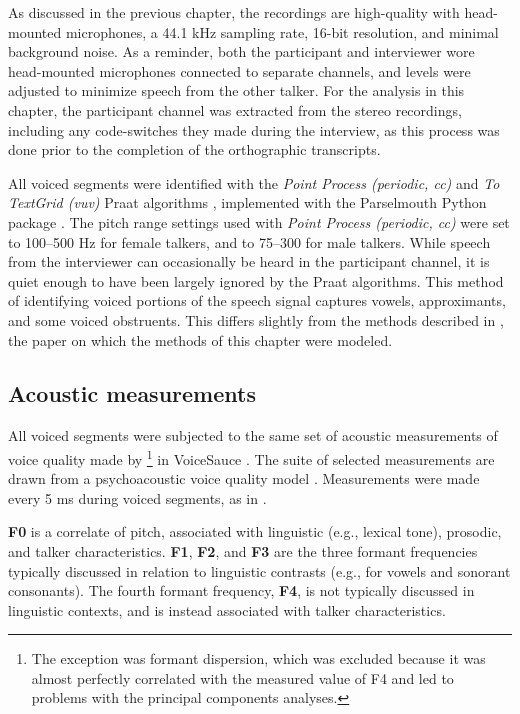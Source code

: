As discussed in the previous chapter, the recordings are high-quality with head-mounted microphones, a 44.1 kHz sampling rate, 16-bit resolution, and minimal background noise. As a reminder, both the participant and interviewer wore head-mounted microphones connected to separate channels, and levels were adjusted to minimize speech from the other talker. For the analysis in this chapter, the participant channel was extracted from the stereo recordings, including any code-switches they made during the interview, as this process was done prior to the completion of the orthographic transcripts. 

All voiced segments were identified with the \textit{Point Process (periodic, cc)} and \textit{To TextGrid (vuv)} Praat algorithms \citep{boersma_2021_praat}, implemented with the Parselmouth Python package \citep{jadoul_2018_parselmouth}. The pitch range settings used with \textit{Point Process (periodic, cc)} were set to 100--500 Hz for female talkers, and to 75--300 for male talkers. While speech from the interviewer can occasionally be heard in the participant channel, it is quiet enough to have been largely ignored by the Praat algorithms. This method of identifying voiced portions of the speech signal captures vowels, approximants, and some voiced obstruents. This differs slightly from the methods described in \citet{lee_2019_acoustic-paper}, the paper on which the methods of this chapter were modeled. 

\subsection{Acoustic measurements}\label{ch3:sec:acoustic}
All voiced segments were subjected to the same set of acoustic measurements of voice quality made by \citet{lee_2019_acoustic-paper}\footnote{The exception was formant dispersion, which was excluded because it was almost perfectly correlated with the measured value of F4 and led to problems with the principal components analyses.} in VoiceSauce \citep{shue_2011_voicesauce}. The suite of selected measurements are drawn from a psychoacoustic voice quality model \citep{kreiman_2014_theory}. Measurements were made every 5 ms during voiced segments, as in \citet{lee_2019_acoustic-paper}.

\textbf{F0} is a correlate of pitch, associated with linguistic (e.g., lexical tone), prosodic, and talker characteristics. \textbf{F1}, \textbf{F2}, and \textbf{F3} are the three formant frequencies typically discussed in relation to linguistic contrasts (e.g., for vowels and sonorant consonants). The fourth formant frequency, \textbf{F4}, is not typically discussed in linguistic contexts, and is instead associated with talker characteristics.

